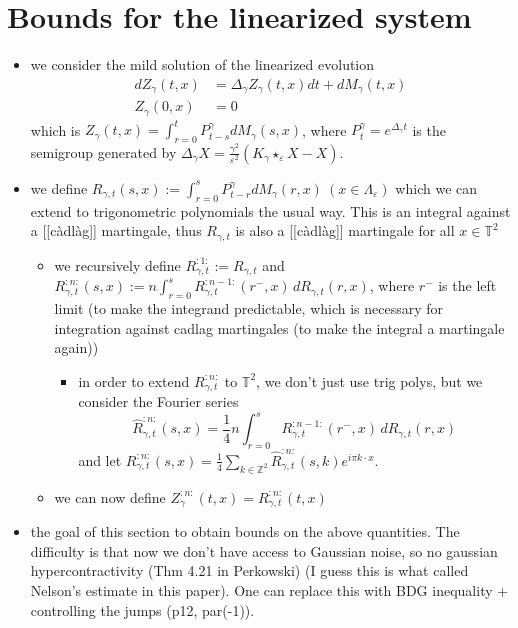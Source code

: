 \documentclass{report}
\theoremstyle{remark}
\theoremstyle{definition}
\let\epsilon\varepsilon
\begin{document}
\chapter{Bounds for the linearized system}
\begin{itemize}
  \item we consider the mild solution of the linearized evolution $$\begin{aligned}dZ_\gamma(t, x) &= \Delta_\gamma Z_\gamma(t, x) dt + dM_\gamma(t, x)\\Z_\gamma(0, x) &= 0 \end{aligned}$$which is $Z_\gamma(t, x) = \int_{r=0}^t P^\gamma_{t-s} dM_\gamma(s, x)$, where $P^\gamma_t = e^{\Delta_\gamma t}$ is the semigroup generated by $\Delta_\gamma X = \frac{\gamma^2}{\epsilon^2}(K_\gamma \star_\epsilon X - X)$. 
  \item we define $R_{\gamma, t}(s, x) := \int_{r=0}^s P^\gamma_{t-r} dM_\gamma(r, x)~(x \in \Lambda_\epsilon)$  which we can extend to trigonometric polynomials the usual way. This is an integral against a [[càdlàg]] martingale, thus $R_{\gamma ,t}$ is also a [[càdlàg]] martingale for all $x \in \mathbb{T}^2$
  \begin{itemize}
    \item we recursively define $R_{\gamma, t}^{:1:} := R_{\gamma, t}$ and $R_{\gamma, t}^{:n:}(s,x) := n\int_{r=0}^s R_{\gamma, t}^{:n-1:}(r^-,x) \,dR_{\gamma, t}(r, x)$, where $r^-$ is the left limit (to make the integrand predictable, which is necessary for integration against cadlag martingales (to make the integral a martingale again))
    \begin{itemize}
      \item in order to extend $R_{\gamma, t}^{:n:}$ to $\mathbb{T}^2$, we don't just use trig polys, but we consider the Fourier series $$\hat{R}_{\gamma, t}^{:n:}(s,x) = \frac{1}{4}n\int_{r=0}^s R_{\gamma, t}^{:n-1:}(r^-,x) \,dR_{\gamma, t}(r, x)$$and let $R_{\gamma, t}^{:n:}(s, x) = \frac{1}{4} \sum_{k \in \mathbb{Z}^2} \hat{R}^{:n:}_{\gamma, t}(s, k)e^{i \pi k \cdot x}$.
    \end{itemize}
    \item we can now define $Z^{:n:}_\gamma(t, x) = R^{:n:}_{\gamma, t}(t, x)$
  \end{itemize}
  \item the goal of this section to obtain bounds on the above quantities. The difficulty is that now we don't have access to Gaussian noise, so no gaussian hypercontractivity (Thm 4.21 in Perkowski) (I guess this is what called Nelson's estimate in this paper). One can replace this with BDG inequality + controlling the jumps (p12, par(-1)).

\end{itemize}
\end{document}
